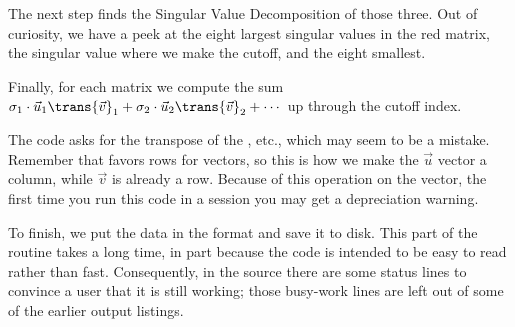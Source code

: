 The next step finds the Singular Value Decomposition of those three.
Out of curiosity, we have a peek at the eight largest singular
values in the red matrix, the singular value where we make the cutoff,
and the eight smallest.


Finally, for each matrix we compute the sum
$\sigma_1\cdot\vec{u}_1\trans{\vec{v}}_1+\sigma_2\cdot\vec{u}_2\trans{\vec{v}}_2
   +\cdots$
up through the cutoff index.

The code asks for the transpose of the
\protect{}, etc., which may seem to be a mistake.
Remember that \protect\Sage{} favors rows for vectors, so this is how we
make the $\vec{u}$ vector a column, while $\vec{v}$ is already a row.
Because of this operation on the vector, the first time you run this
code in a \protect\Sage{} session you may get a depreciation warning.

To finish, we put the data in the  format and save it to 
disk.
This part of the routine takes a long time, in part because
the code is intended to be easy to read rather than fast.
Consequently, in the source there are some status lines to
convince a user that it is still working; 
those busy-work lines are left out of 
some of the earlier output listings.


\endinput


TODO:
1) mention Sage matrices are not mutable in matrix introduction.
Is mutable discussed in Intro?

2) Need int() fcns?  copy() fcn?